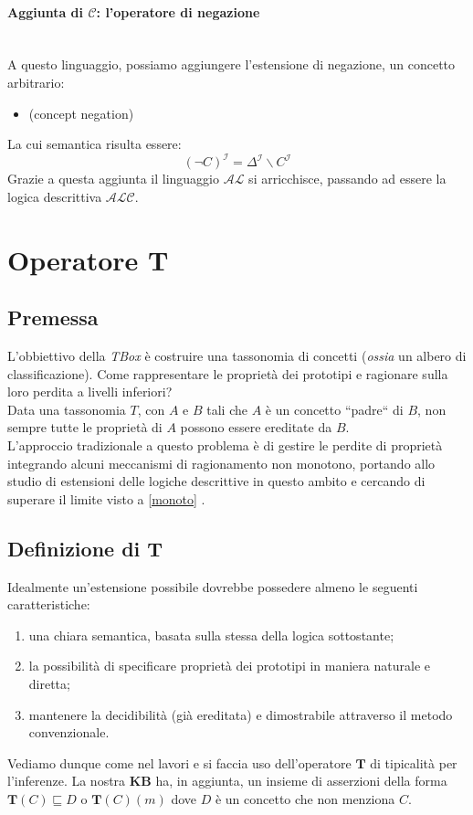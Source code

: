 \paragraph{Aggiunta di $\mathcal{C}$: l’operatore di negazione} \hfill \\
A questo linguaggio, possiamo aggiungere l’estensione di negazione, un concetto arbitrario:
\begin{itemize}
	\item[]  (concept negation)
\end{itemize}
La cui semantica risulta essere:
\[ (\neg C)^{\mathcal{I}} =  \Delta^{\mathcal{I}}\backslash C^{\mathcal{I}}\]
Grazie a questa aggiunta il linguaggio $ \mathcal{AL} $ si arricchisce, 
passando ad essere la logica descrittiva $ \mathcal{ALC} $.
\section{Operatore T}
\subsection{Premessa}
L'obbiettivo della \textit{TBox} è costruire una tassonomia di concetti (\textit{ossia} un albero di classificazione). 
Come rappresentare le proprietà dei prototipi e ragionare sulla loro perdita a livelli inferiori? \\
Data una tassonomia $T$, con $A$ e $B$ tali che $A$ è un concetto “padre“ di $B$, 
non sempre tutte le proprietà di $A$ possono essere ereditate da $B$.\\
L’approccio tradizionale a questo problema è di gestire le perdite di proprietà 
integrando alcuni meccanismi di ragionamento non monotono, portando allo studio di estensioni 
delle logiche descrittive in questo ambito e cercando di superare il limite visto a \ref{monoto} .
\subsection{Definizione di T}
Idealmente un'estensione possibile dovrebbe possedere almeno le seguenti caratteristiche:
\begin{enumerate}
	\item una chiara semantica, basata sulla stessa della logica sottostante;
	\item la possibilità di specificare proprietà dei prototipi in maniera naturale e diretta;
	\item mantenere la decidibilità (già ereditata) e dimostrabile attraverso il metodo convenzionale.
\end{enumerate}
Vediamo dunque come nel lavori \cite{DLExtension} e \cite{COCOS} si faccia uso dell'operatore $ \mathbf{T} $ di 
tipicalità per l'inferenze. La nostra \textbf{KB} ha, in aggiunta, un insieme di asserzioni della forma
$ \mathbf{T}(C) \sqsubseteq D $ o $ \mathbf{T}(C)(m) $ dove $ D $ è un concetto che non menziona $ C $.

